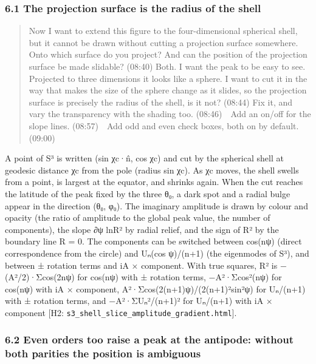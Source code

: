 \documentclass[
  a4paper,
]{article}
\begin{document}
\subsubsection{6.1 The projection surface is the radius of the
shell}\label{the-projection-surface-is-the-radius-of-the-shell}

\begin{quote}
Now I want to extend this figure to the four-dimensional spherical
shell, but it cannot be drawn without cutting a projection surface
somewhere. Onto which surface do you project? And can the position of
the projection surface be made slidable? (08:40) Both. I want the peak
to be easy to see. Projected to three dimensions it looks like a sphere.
I want to cut it in the way that makes the size of the sphere change as
it slides, so the projection surface is precisely the radius of the
shell, is it not? (08:44) Fix it, and vary the transparency with the
shading too. (08:46)　Add an on/off for the slope lines. (08:57)　Add
odd and even check boxes, both on by default. (09:00)
\end{quote}

A point of S³ is written (sin χc·n̂, cos χc) and cut by the spherical
shell at geodesic distance χc from the pole (radius sin χc). As χc
moves, the shell swells from a point, is largest at the equator, and
shrinks again. When the cut reaches the latitude of the peak fixed by
the three θ₀, a dark spot and a radial bulge appear in the direction
(θ₀, φ₀). The imaginary amplitude is drawn by colour and opacity (the
ratio of \textbar amplitude\textbar{} to the global peak value, the
number of components), the slope ∂ψ ln\textbar R²\textbar{} by radial
relief, and the sign of R² by the boundary line R = 0. The components
can be switched between cos(nψ) (direct correspondence from the circle)
and Uₙ(cos ψ)/(n+1) (the eigenmodes of S³), and between ± rotation terms
and iA × component. With true squares, R² is −(A²/2)·Σcos(2nψ) for
cos(nψ) with ± rotation terms, −A²·Σcos²(nψ) for cos(nψ) with iA ×
component, A²·Σcos(2(n+1)ψ)/(2(n+1)²sin²ψ) for Uₙ/(n+1) with ± rotation
terms, and −A²·ΣUₙ²/(n+1)² for Uₙ/(n+1) with iA × component {[}H2:
\texttt{s3\_\allowbreak{}shell\_\allowbreak{}slice\_\allowbreak{}amplitude\_\allowbreak{}gradient.html}{]}.

\subsubsection{6.2 Even orders too raise a peak at the antipode: without
both parities the position is
ambiguous}\label{even-orders-too-raise-a-peak-at-the-antipode-without-both-parities-the-position-is-ambiguous}
\end{document}
